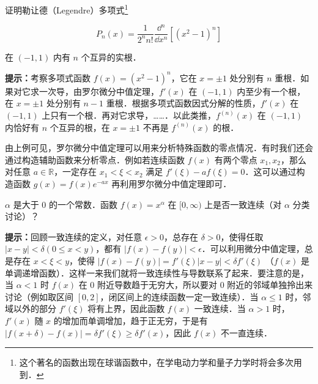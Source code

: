 \begin{exercise}{}
证明勒让德（Legendre）多项式\footnote{这个著名的函数出现在球谐函数中，在学电动力学和量子力学时将会多次用到．}

\begin{equation}
P_n(x)=\frac{1}{2^n n!}\frac{\dd{} ^n}{\dd x^n}[(x^2-1)^n]
\end{equation}

在 $(-1,1)$ 内有 $n$ 个互异的实根．

\textbf{提示：}考察多项式函数 $f(x)=(x^2-1)^n$，它在 $x=\pm 1$ 处分别有 $n$ 重根．如果对它求一次导，由罗尔微分中值定理，$f'(x)$ 在 $(-1,1)$ 内至少有一个根，在 $x=\pm 1$ 处分别有 $n-1$ 重根．根据多项式函数因式分解的性质，$f'(x)$ 在 $(-1,1)$ 上只有一个根．再对它求导，……．以此类推，$f^{(n)}(x)$ 在 $(-1,1)$ 内恰好有 $n$ 个互异的根，在 $x=\pm 1$ 不再是 $f^{(n)}(x)$ 的根．
\end{exercise}
由上例可见，罗尔微分中值定理可以用来分析特殊函数的零点情况．有时我们还会通过构造辅助函数来分析零点．例如若连续函数 $f(x)$ 有两个零点 $x_1,x_2$，那么对任意 $a\in \mathbb{R}$，一定存在 $x_1<\xi<x_2$ 满足 $f'(\xi)-af(\xi)=0$．这可以通过构造函数 $g(x)=f(x)e^{-ax}$ 再利用罗尔微分中值定理即可．

\begin{exercise}{}
$\alpha$ 是大于 $0$ 的一个常数．函数 $f(x)=x^\alpha$ 在 $[0,\infty)$ 上是否一致连续（对 $\alpha$ 分类讨论）？

\textbf{提示：}回顾一致连续的定义，对任意 $\epsilon>0$，总存在 $\delta>0$，使得任取 $|x-y|<\delta(0\le x<y)$，都有 $|f(x)-f(y)|<\epsilon$．可以利用微分中值定理，总是存在 $x< \xi <y$，使得 $|f(x)-f(y)|=f'(\xi)|x-y|<\delta f'(\xi)$ （$f(x)$ 是单调递增函数）．这样一来我们就将一致连续性与导数联系了起来．要注意的是，当 $\alpha<1$ 时 $f(x)$ 在 $0$ 附近导数趋于无穷大，所以要对 $0$ 附近的邻域单独拎出来讨论（例如取区间 $[0,2]$，闭区间上的连续函数一定一致连续）．当 $\alpha\le1$ 时，邻域以外的部分 $f'(\xi)$ 将有上界，因此函数 $f(x)$ 一致连续．当 $\alpha>1$ 时，$f'(x)$ 随 $x$ 的增加而单调增加，趋于正无穷，于是有 $|f(x+\delta)-f(x)|=\delta f'(\xi) \ge\delta f'(x)$，因此 $f(x)$ 不一直连续．
\end{exercise}

